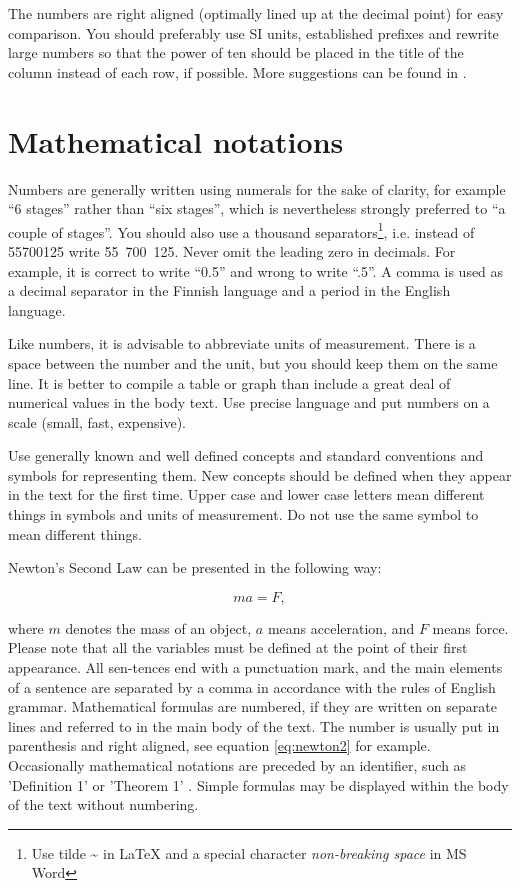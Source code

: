 \documentclass[12pt,a4paper,finnish]{tutthesis}
\begin{document}
The numbers are right aligned (optimally lined up at the decimal
point) for easy comparison. You should preferably use SI units,
established prefixes and rewrite large numbers so that the power of
ten should be placed in the title of the column instead of each row,
if possible. More suggestions can be found in \cite{salminen09}.

\section{Mathematical notations}

Numbers are generally written using numerals for the sake of clarity,
for example ``6 stages'' rather than ``six stages'', which is
nevertheless strongly preferred to ``a couple of stages''. You should
also use a thousand separators\footnote{Use tilde \~{} in LaTeX and a
  special character \textit{non-breaking space} in MS Word},
i.e. instead of 55700125 write 55~700~125. Never omit the leading zero
in decimals. For example, it is correct to write ``0.5'' and wrong to
write ``.5''. A comma is used as a decimal separator in the Finnish
language and a period in the English language.

Like numbers, it is advisable to abbreviate units of
measurement. There is a space between the number and the unit, but you
should keep them on the same line. It is better to compile a table or
graph than include a great deal of numerical values in the body
text. Use precise language and put numbers on a scale (small, fast,
expensive).

Use generally known and well defined concepts and standard conventions
and symbols for representing them. New concepts should be defined when
they appear in the text for the first time. Upper case and lower case
letters mean different things in symbols and units of measurement. Do
not use the same symbol to mean different things.

Newton's Second Law can be presented in the following way:

\begin{equation}
  \label{eq:newton2}
 ma= F,
\end{equation}

where $m$ denotes the mass of an object, $a$ means acceleration, and
$F$ means force. Please note that all the variables must be defined at
the point of their first appearance. All sen-tences end with a
punctuation mark, and the main elements of a sentence are separated by
a comma in accordance with the rules of English grammar.  Mathematical
formulas are numbered, if they are written on separate lines and
referred to in the main body of the text. The number is usually put in
parenthesis and right aligned, see equation \ref{eq:newton2} for
example. Occasionally mathematical notations are preceded by an
identifier, such as 'Definition 1' or 'Theorem 1'
\cite{ruohonen09}. Simple formulas may be displayed within the body of
the text without numbering.
\end{document}
